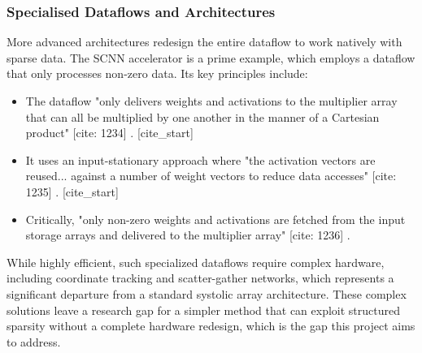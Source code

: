     \subsubsection{Specialised Dataflows and Architectures} \label{sec: dataflow}
    More advanced architectures redesign the entire dataflow to work natively with sparse data. The SCNN accelerator is a prime example, which employs a dataflow that only processes non-zero data. Its key principles include:
    \begin{itemize}
        [cite_start]\item The dataflow "only delivers weights and activations to the multiplier array that can all be multiplied by one another in the manner of a Cartesian product" [cite: 1234] \cite{parashar_scnn_2017}.
        [cite_start]\item It uses an input-stationary approach where "the activation vectors are reused... against a number of weight vectors to reduce data accesses" [cite: 1235] \cite{parashar_scnn_2017}.
        [cite_start]\item Critically, "only non-zero weights and activations are fetched from the input storage arrays and delivered to the multiplier array" [cite: 1236] \cite{parashar_scnn_2017}.
    \end{itemize}
    While highly efficient, such specialized dataflows require complex hardware, including coordinate tracking and scatter-gather networks, which represents a significant departure from a standard systolic array architecture. These complex solutions leave a research gap for a simpler method that can exploit structured sparsity without a complete hardware redesign, which is the gap this project aims to address.